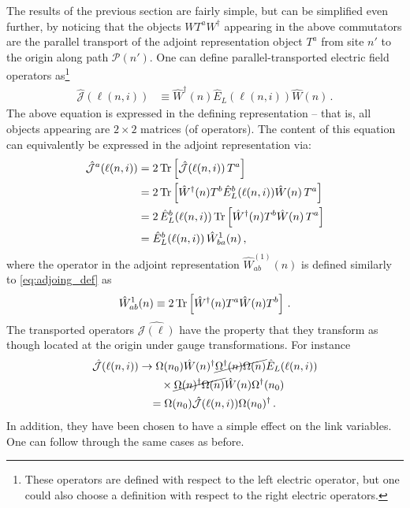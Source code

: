 \documentclass[reprint,superscriptaddress,pra,nofootinbib,preprintnumbers,floatfix]{revtex4-1}
\begin{document}
The results of the previous section are fairly simple, but can be simplified even further, by noticing that the objects
$W T^a W^\dagger$ appearing in the above commutators are the parallel transport of the adjoint representation object $T^a$ from site $n'$ to the origin along path $\mathcal{P}(n')$. 
%
One can define parallel-transported electric field operators as\footnote{These operators are defined with respect to the left electric operator, but one could also choose a definition with respect to the right electric operators.}
%
\begin{align}
    \hat{\mathcal{J}}(\ell(n,i)) &\equiv \hat W^\dagger(n) \hat E_L(\ell(n,i)) \hat W(n)
    \,.
\end{align}
%
The above equation is expressed in the defining representation -- that is, all objects appearing are $2 \times 2$ matrices (of operators). The content of this equation can equivalently be expressed in the adjoint representation via:
%
\begin{align}
    \hat{\mathcal{J}}^a(\ell(n,i)) &= 2 \Tr\left[\hat{\mathcal{J}}(\ell(n,i))\, T^a \right]\nonumber\\
    &= 2 \Tr\left[\hat W^\dagger(n) T^b \hat E^b_L(\ell(n,i)) \hat W(n)\, T^a \right]\nonumber\\
    &= 2 \, \hat E_L^b(\ell(n,i))\Tr\left[\hat W^\dagger(n) T^b \hat W(n)\, T^a \right]\nonumber\\
    &= \hat E_L^b(\ell(n,i)) \,\hat W^{1}_{ba}(n)
    \,,
\end{align}
%
where the operator in the adjoint representation $\hat W^{(1)}_{ab}(n)$ is defined similarly to \cref{eq:adjoing_def} as
%
\begin{align}
    \hat W^{1}_{ab}(n) \equiv 2 \Tr\left[ \hat W^\dagger(n) T^a \hat W(n) T^b\right]
    \,.
\end{align}
The transported operators $\hat{\mathcal{J}(\ell)}$ have the property that they transform as though located at the origin under gauge transformations. 
%
For instance
%
\begin{align}
\label{eq:global_gauge_J}
    \hat{\mathcal{J}}(\ell(n,i)) &\to \Omega(n_0) \hat W(n)^\dagger \cancel{\Omega^\dagger(n) \Omega(n)} \hat E_L(\ell(n,i))\nonumber\\
    & \qquad \times \cancel{\Omega(n)^\dagger\Omega(n)} \hat W(n) \Omega^\dagger(n_0)\nonumber \\
    & \quad = \Omega(n_0) \hat{\mathcal{J}}(\ell(n,i)) \Omega(n_0)^\dagger
    \,.
\end{align}
%
In addition, they have been chosen to have a simple effect on the link variables. 
%
One can follow through the same cases as before.
%
\end{document}

